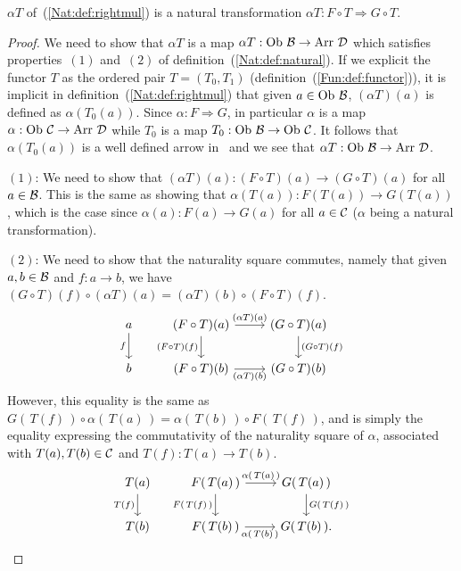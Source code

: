 \begin{prop}\label{Nat:prop:rightmul}
    $\alpha T$ of~(\ref{Nat:def:rightmul}) is a natural transformation 
    $\alpha T:F\circ T\Rightarrow G\circ T$.
\end{prop}
\begin{proof}
    We need to show that $\alpha T$ is a map $\alpha T : \ob\ \Bat\to\arr\ \Dat$
    which satisfies properties~$(1)$ and~$(2)$ of 
    definition~(\ref{Nat:def:natural}). If we explicit the functor $T$ as the 
    ordered pair $T=(T_{0},T_{1})$ (definition~(\ref{Fun:def:functor})), it is
    implicit in definition~(\ref{Nat:def:rightmul}) that given $a\in\mbox{\rm Ob}\ \mbox{$\cal B$}$,
    $(\alpha T)(a)$ is defined as $\alpha (T_{0}(a))$. Since 
    $\alpha:F\Rightarrow G$, in particular $\alpha$ is a map $\alpha:\mbox{\rm Ob}\ \mbox{$\cal C$}
    \to\mbox{\rm Arr}\ \mbox{$\cal D$}$ while $T_{0}$ is a map $T_{0}:\mbox{\rm Ob}\ \mbox{$\cal B$}\to\mbox{\rm Ob}\ \mbox{$\cal C$}$. It 
    follows that $\alpha (T_{0}(a))$ is a well defined arrow in \Dat\ and we
    see that $\alpha T:\ob\ \Bat\to\arr\ \Dat$.

    $(1)$: We need to show that $(\alpha T)(a): (F\circ T)(a) \to (G\circ T)(a)$
    for all $a\in\mbox{$\cal B$}$. This is the same as showing that $\alpha (T(a)) :
    F(T(a))\to G(T(a))$, which is the case since $\alpha(a):F(a)\to G(a)$ for
    all $a\in\mbox{$\cal C$}$ ($\alpha$ being a natural transformation).

    $(2)$: We need to show that the naturality square commutes, namely that
    given $a,b\in\mbox{$\cal B$}$ and $f:a\to b$, we have $(G\circ T)(f)\circ(\alpha T)(a)
    =(\alpha T)(b)\circ(F\circ T)(f)$.
    \[
        \begin{tikzcd}
            a\arrow[d,swap, "f"]
            &(F\circ T)(a)\arrow[r, "(\alpha T)(a)"]\arrow[d, swap,"(F\circ T)(f)"]
            &(G\circ T)(a)\arrow[d, "(G\circ T)(f)"]
            \\
            b
            &(F\circ T)(b)\arrow[r, swap, "(\alpha T)(b)"]
            &(G\circ T)(b)
        \end{tikzcd}
    \]
    However, this equality is the same as $G(\,T(f)\,)\circ\alpha(\,T(a)\,)
    =\alpha(\,T(b)\,)\circ F(\,T(f)\,)$, and is simply the equality expressing
    the commutativity of the naturality square of $\alpha$, associated with 
    $T(a),T(b)\in\mbox{$\cal C$}$ and $T(f):T(a)\to T(b)$.
    \[
        \begin{tikzcd}
            T(a)\arrow[d,swap, "T(f)"]
            &F(\,T(a)\,)\arrow[r, "\alpha(\,T(a)\,)"]\arrow[d, swap,"F(\,T(f)\,)"]
            &G(\,T(a)\,)\arrow[d, "G(\,T(f)\,)"]
            \\
            T(b)
            &F(\,T(b)\,)\arrow[r, swap, "\alpha(\,T(b)\,)"]
            &G(\,T(b)\,).
        \end{tikzcd}
    \]
\end{proof}
